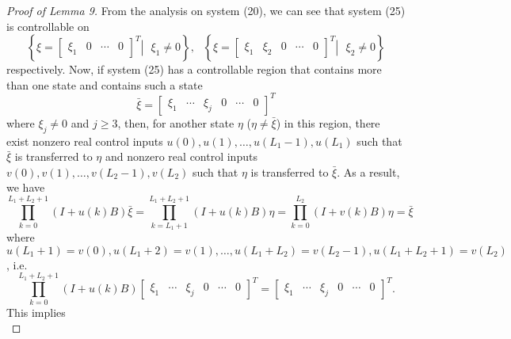 \documentclass[journal,a4paper,12pt,onecolumn]{IEEEtran}
\begin{document}
\begin{proof}[Proof of Lemma 9]
From the analysis on system (20), we can see that system (25) is
controllable on\begin{equation*}
\left\{ \xi =\left[
\begin{array}{cccc}
\xi _{1} & 0 & \cdots & 0\end{array}\right] ^{T}\left\vert \text{ }\xi _{1}\neq 0\right. \right\} ,\text{ }\left\{ \xi =\left[
\begin{array}{ccccc}
\xi _{1} & \xi _{2} & 0 & \cdots & 0\end{array}\right] ^{T}\left\vert \text{ }\xi _{2}\neq 0\right. \right\}
\end{equation*}respectively. Now, if system (25) has a controllable region that contains
more than one state and contains such a state\begin{equation*}
\bar{\xi}=\left[
\begin{array}{cccccc}
\xi _{1} & \cdots & \xi _{j} & 0 & \cdots & 0\end{array}\right] ^{T}
\end{equation*}where $\xi _{j}\neq 0$ and $j\geq 3$, then, for another state $\eta $ ($\eta
\neq \bar{\xi}$) in this region, there exist nonzero real control inputs $u(0),u(1),\ldots ,u(L_{1}-1),u\left( L_{1}\right) $ such that $\bar{\xi}$ is
transferred to $\eta $ and nonzero real control inputs $v(0),v(1),\ldots
,v(L_{2}-1),v\left( L_{2}\right) $ such that $\eta $ is transferred to $\bar{\xi}$. As a result, we have\begin{equation*}
\prod\limits_{k=0}^{L_{1}+L_{2}+1}\left( I+u\left( k\right) B\right) \bar{\xi }=\prod\limits_{k=L_{1}+1}^{L_{1}+L_{2}+1}\left( I+u\left( k\right) B\right)
\eta =\prod\limits_{k=0}^{L_{2}}\left( I+v\left( k\right) B\right) \eta =\bar{\xi}
\end{equation*}where $u\left( L_{1}+1\right) =v(0),u\left( L_{1}+2\right) =v(1),\ldots
,u\left( L_{1}+L_{2}\right) =v(L_{2}-1),u\left( L_{1}+L_{2}+1\right)
=v\left( L_{2}\right) $, i.e.\begin{equation*}
\prod\limits_{k=0}^{L_{1}+L_{2}+1}\left( I+u\left( k\right) B\right) \left[
\begin{array}{cccccc}
\xi _{1} & \cdots & \xi _{j} & 0 & \cdots & 0\end{array}\right] ^{T}=\left[
\begin{array}{cccccc}
\xi _{1} & \cdots & \xi _{j} & 0 & \cdots & 0\end{array}\right] ^{T}.
\end{equation*}This implies\begin{equation}

\end{equation}
\end{proof}
\end{document}
